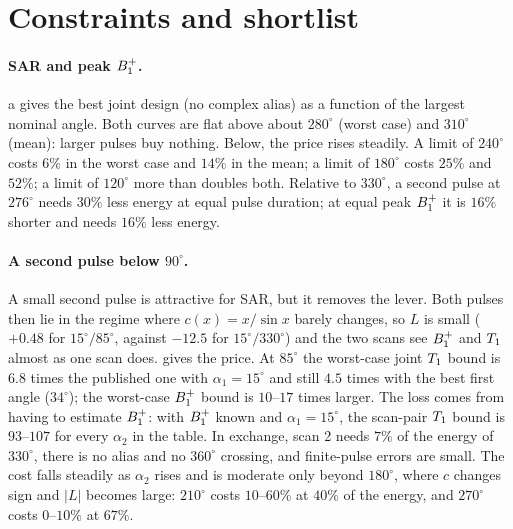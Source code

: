 \section{Constraints and shortlist}\label{sec:constraints}

\paragraph{SAR and peak $B_1^{+}$.} a gives the best joint design (no complex alias)
as a function of the largest nominal angle. Both curves are flat above about $280^\circ$ (worst case)
and $310^\circ$ (mean): larger pulses buy nothing. Below, the price rises steadily. A limit of $240^\circ$
costs $6\%$ in the worst case and $14\%$ in the mean; a limit of $180^\circ$ costs $25\%$ and $52\%$; a
limit of $120^\circ$ more than doubles both. Relative to $330^\circ$, a second pulse at $276^\circ$ needs $30\%$ less
energy at equal pulse duration; at equal peak $B_1^{+}$ it is $16\%$ shorter and needs $16\%$ less energy.

\paragraph{A second pulse below $90^\circ$.} A small second pulse is attractive for SAR, but it removes
the lever. Both pulses then lie in the regime where $c(x)=x/\sin x$ barely changes, so $L$ is small
($+0.48$ for $15^\circ/85^\circ$, against $-12.5$ for $15^\circ/330^\circ$) and the two scans see $B_1^{+}$ and $T_1$ almost as one
scan does.  gives the price. At $85^\circ$ the worst-case joint $T_1$ bound is $6.8$ times the
published one with $\alpha_1=15^\circ$ and still $4.5$ times with the best first angle ($34^\circ$); the worst-case $B_1^{+}$ bound is
$10$--$17$ times larger. The loss comes from having to estimate $B_1^{+}$: with $B_1^{+}$ known and $\alpha_1=15^\circ$, the scan-pair $T_1$
bound is $93$--$107$ for every $\alpha_2$ in the table. In exchange, scan 2 needs $7\%$ of the energy of
$330^\circ$, there is no alias and no $360^\circ$ crossing, and finite-pulse errors are small. The cost falls steadily as $\alpha_2$ rises
and is moderate only beyond $180^\circ$, where $c$ changes sign and $|L|$ becomes large: $210^\circ$ costs $10$--$60\%$ at
$40\%$ of the energy, and $270^\circ$ costs $0$--$10\%$ at $67\%$.

